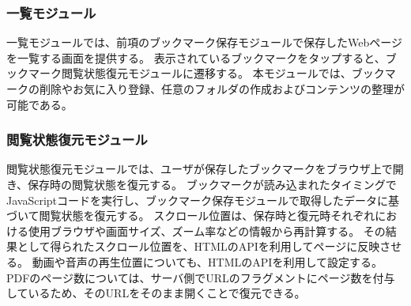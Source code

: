 \subsubsection{一覧モジュール}
一覧モジュールでは、前項のブックマーク保存モジュールで保存したWebページを一覧する画面を提供する。
表示されているブックマークをタップすると、ブックマーク閲覧状態復元モジュールに遷移する。
本モジュールでは、ブックマークの削除やお気に入り登録、任意のフォルダの作成およびコンテンツの整理が可能である。

\subsubsection{閲覧状態復元モジュール}
閲覧状態復元モジュールでは、ユーザが保存したブックマークをブラウザ上で開き、保存時の閲覧状態を復元する。
ブックマークが読み込まれたタイミングでJavaScriptコードを実行し、ブックマーク保存モジュールで取得したデータに基づいて閲覧状態を復元する。
スクロール位置は、保存時と復元時それぞれにおける使用ブラウザや画面サイズ、ズーム率などの情報から再計算する。
その結果として得られたスクロール位置を、HTMLのAPIを利用してページに反映させる。
動画や音声の再生位置についても、HTMLのAPIを利用して設定する。
PDFのページ数については、サーバ側でURLのフラグメントにページ数を付与しているため、そのURLをそのまま開くことで復元できる。
